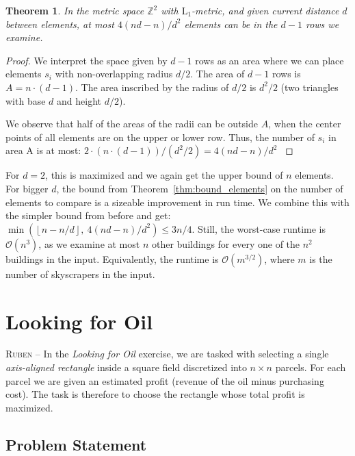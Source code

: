 \documentclass[a4paper,12pt,headsepline]{scrartcl}
\newtheorem{theorem}{Theorem}
\begin{document}
    \begin{theorem}
        In the metric space $\mathbb{Z}^2$ with $\operatorname{L_1}$-metric, and given current distance $d$ between elements, at most $4(nd-n)/d^2$ elements can be in the $d-1$ rows we examine.
    \end{theorem}
    \begin{proof}
        We interpret the space given by $d-1$ rows as an area where we can place elements $s_i$ with non-overlapping radius $d/2$.
        The area of $d-1$ rows is $A = n \cdot (d-1)$. The area inscribed by the radius of $d/2$ is $d^2/2$ (two triangles with base $d$ and height $d/2$). %
        
        We observe that half of the areas of the radii can be outside $A$, when the center points of all elements are on the upper or lower row. Thus, the number of $s_i$ in area A is at most:
        $
        2 \cdot (n \cdot (d-1))/(d^2/2) = 4(nd - n)/d^2
        $
        \label{thm:bound_elements}
    \end{proof}
    For $d = 2$, this is maximized and we again get the upper bound of $n$ elements.
    For bigger $d$, the bound from Theorem~\ref{thm:bound_elements} on the number of elements to compare is a sizeable improvement in run time.
    We combine this with the simpler bound from before and get: $\min(\left \lfloor n - n/d \right \rfloor,\ 4(nd - n)/d^2) \leq 3n/4$.
    Still, the worst-case runtime is $\mathcal{O}(n^3)$, as we examine at most $n$ other buildings for every one of the $n^2$ buildings in the input. 
    Equivalently, the runtime is $\mathcal{O}(m^{3/2})$, where $m$ is the number of skyscrapers in the input.
\newpage
\section{Looking for Oil} \label{sec:LookingForOil}
\textsc{Ruben --}
In the \emph{Looking for Oil} exercise, we are tasked with selecting a single \emph{axis-aligned rectangle} inside a square field discretized into $n \times n$ parcels. For each parcel we are given an estimated profit (revenue of the oil minus purchasing cost). The task is therefore to choose the rectangle whose total profit is maximized.

\subsection{Problem Statement}
\end{document}
